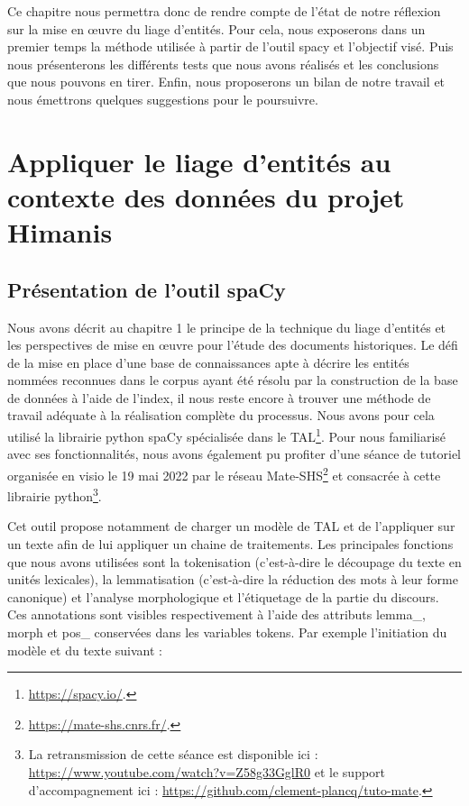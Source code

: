 \documentclass[a4paper,12pt,twoside]{book}
\begin{document}
	Ce chapitre nous permettra donc de rendre compte de l'état de notre réflexion sur la mise en œuvre du liage d'entités. Pour cela, nous exposerons dans un premier temps la méthode utilisée à partir de l'outil spacy et l'objectif visé. Puis nous présenterons les différents tests que nous avons réalisés et les conclusions que nous pouvons en tirer. Enfin, nous proposerons un bilan de notre travail et nous émettrons quelques suggestions pour le poursuivre.
	
	\section{Appliquer le liage d'entités au contexte des données du projet Himanis}
	
	\subsection{Présentation de l'outil spaCy}
	
	Nous avons décrit au chapitre 1 le principe de la technique du liage d'entités et les perspectives de mise en œuvre pour l'étude des documents historiques. Le défi de la mise en place d'une base de connaissances apte à décrire les entités nommées reconnues dans le corpus ayant été résolu par la construction de la base de données à l'aide de l'index, il nous reste encore à trouver une méthode de travail adéquate à la réalisation complète du processus. Nous avons pour cela utilisé la librairie python spaCy spécialisée dans le TAL\footnote{\url{https://spacy.io/}.}. Pour nous familiarisé avec ses fonctionnalités, nous avons également pu profiter d'une séance de tutoriel organisée en visio le 19 mai 2022 par le réseau Mate-SHS\footnote{\url{https://mate-shs.cnrs.fr/}.} et consacrée à cette librairie python\footnote{La retransmission de cette séance est disponible ici : \url{https://www.youtube.com/watch?v=Z58g33GglR0} et le support d'accompagnement ici : \url{https://github.com/clement-plancq/tuto-mate}.}.
	
	Cet outil propose notamment de charger un modèle de TAL et de l'appliquer sur un texte afin de lui appliquer un chaine de traitements. Les principales fonctions que nous avons utilisées sont la tokenisation (c'est-à-dire le découpage du texte en unités lexicales), la lemmatisation (c'est-à-dire la réduction des mots à leur forme canonique) et l'analyse morphologique et l'étiquetage de la partie du discours. Ces annotations sont visibles respectivement à l'aide des attributs \og lemma\_\fg{}, \og morph\fg{} et \og pos\_\fg{} conservées dans les variables tokens. Par exemple l'initiation du modèle et du texte suivant :
	
\end{document}

